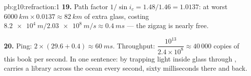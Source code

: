 \begin{solution}{pb:g10:refraction:1}
\textbf{19.} Path factor $1/\sin i_c = 1.48/1.46 = 1.0137$: at worst
$\qty{6000}{km} \times 0.0137 \approx \qty{82}{km}$ of extra glass,
costing $\qty{8.2e4}{m} / \qty{2.03e8}{m/s} \approx \qty{0.4}{ms}$ ---
the zigzag is nearly free.

\textbf{20.} Ping: $2 \times (29.6 + 0.4) \approx \qty{60}{ms}$.
Throughput: $\dfrac{10^{13}}{2.4 \times 10^8} \approx 40\,000$ copies
of this book per second. In one sentence: by trapping light inside
glass through ,  carries a library
across the ocean every second, sixty milliseconds there and back.
\end{solution}
